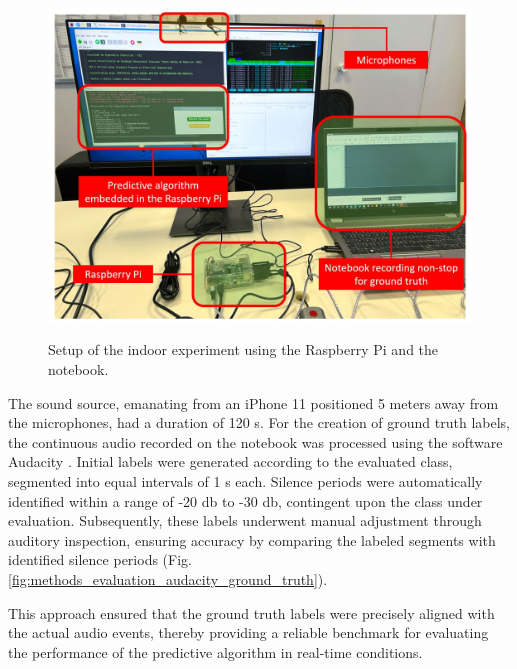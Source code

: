 \begin{figure}[htbp]
    \raggedright
        \caption{Setup of the indoor experiment using the Raspberry Pi and the notebook.}
        \includegraphics[width=1\textwidth]{resources/images/050-methods/Methods_evaluation_indoor.jpg}
        \label{fig:methods_evaluation_indoor_experiment}
\end{figure}

The sound source, emanating from an iPhone 11 positioned 5 meters away from the microphones, had a duration of 120 \gls{s}. For the creation of ground truth labels, the continuous audio recorded on the notebook was processed using the software Audacity \cite{Audacity2024}. Initial labels were generated according to the evaluated class, segmented into equal intervals of 1 \gls{s} each. Silence periods were automatically identified within a range of -20 \gls{db} to -30 \gls{db}, contingent upon the class under evaluation. Subsequently, these labels underwent manual adjustment through auditory inspection, ensuring accuracy by comparing the labeled segments with identified silence periods (Fig. \ref{fig:methods_evaluation_audacity_ground_truth}).

This approach ensured that the ground truth labels were precisely aligned with the actual audio events, thereby providing a reliable benchmark for evaluating the performance of the predictive algorithm in real-time conditions.

